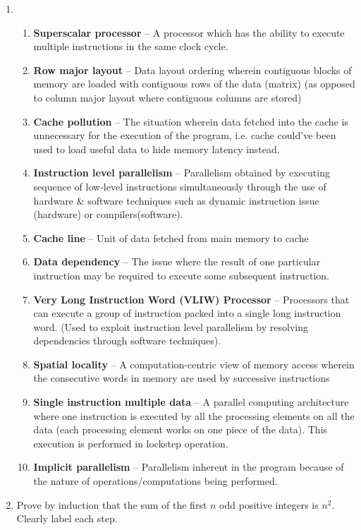 \documentclass{article}
\begin{document}
\begin{enumerate}[label=\Large\textbf{\arabic*}.]
\item
\begin{enumerate}[label={\arabic*}.]
	\item \textbf{Superscalar processor} -- A processor which has the ability to execute multiple instructions in the same clock cycle.
	\item \textbf{Row major layout} -- Data layout ordering wherein contiguous blocks of memory are loaded with contiguous rows of the data (matrix) (as opposed to column major layout where contiguous columns are stored)
	\item \textbf{Cache pollution} -- The situation wherein data fetched into the cache is unnecessary for the execution of the program, i.e. cache could've been used to load useful data to hide memory latency instead.
	\item \textbf{Instruction level parallelism} -- Parallelism obtained by executing sequence of low-level instructions simultaneously through the use of hardware \& software techniques such as dynamic instruction issue (hardware) or compilers(software).
	\item \textbf{Cache line} -- Unit of data fetched from main memory to cache
	\item \textbf{Data dependency} -- The issue where the result of one particular instruction may be required to execute some subsequent instruction.
	\item \textbf{Very Long Instruction Word (VLIW) Processor} -- Processors that can execute a group of instruction packed into a single long instruction word. (Used to exploit instruction level parallelism by resolving dependencies through software techniques).
	\item \textbf{Spatial locality} -- A computation-centric view of memory access wherein the consecutive words in memory are used by successive instructions
	\item \textbf{Single instruction multiple data} -- A parallel computing architecture where one instruction is executed by all the processing elements on all the data (each processing element works on one piece of the data). This execution is performed in lockstep operation.
	\item \textbf{Implicit parallelism} -- Parallelism inherent in the program because of the nature of operations/computations being performed.
\end{enumerate}

\item  Prove by induction that the sum of the first $n$ odd positive integers is $n^2$.  Clearly label each step.



\end{enumerate}
\end{document}
